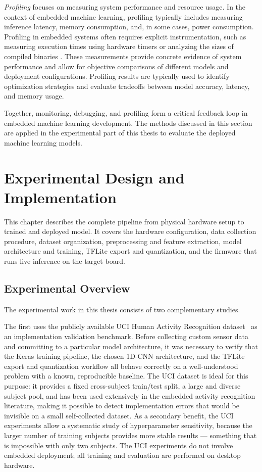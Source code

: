 \emph{Profiling} focuses on measuring system performance and resource usage. In the context of embedded machine learning, profiling typically includes measuring inference latency, memory consumption, and, in some cases, power consumption. Profiling in embedded systems often requires explicit instrumentation, such as measuring execution times using hardware timers or analyzing the sizes of compiled binaries \cite{warden2019tinyml}. These measurements provide concrete evidence of system performance and allow for objective comparisons of different models and deployment configurations. Profiling results are typically used to identify optimization strategies and evaluate tradeoffs between model accuracy, latency, and memory usage.

Together, monitoring, debugging, and profiling form a critical feedback loop in embedded machine learning development. The methods discussed in this section are applied in the experimental part of this thesis to evaluate the deployed machine learning models.

\chapter{Experimental Design and Implementation}
\label{chap:design}

This chapter describes the complete pipeline from physical hardware setup to trained and deployed model. It covers the hardware configuration, data collection procedure, dataset organization, preprocessing and feature extraction, model architecture and training, TFLite export and quantization, and the firmware that runs live inference on the target board.

\section{Experimental Overview}
The experimental work in this thesis consists of two complementary studies.
 
The first uses the publicly available UCI Human Activity Recognition dataset~\cite{anguita2013uci} as an implementation validation benchmark. Before collecting custom sensor data and committing to a particular model architecture, it was necessary to verify that the Keras training pipeline, the chosen 1D-CNN architecture, and the TFLite export and quantization workflow all behave correctly on a well-understood problem with a known, reproducible baseline. The UCI dataset is ideal for this purpose: it provides a fixed cross-subject train/test split, a large and diverse subject pool, and has been used extensively in the embedded activity recognition literature, making it possible to detect implementation errors that would be invisible on a small self-collected dataset. As a secondary benefit, the UCI experiments allow a systematic study of hyperparameter sensitivity, because the larger number of training subjects provides more stable results — something that is impossible with only two subjects. The UCI experiments do not involve embedded deployment; all training and evaluation are performed on desktop hardware.
 
